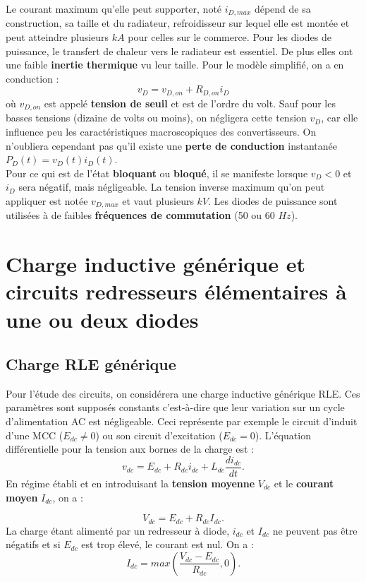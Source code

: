 		Le courant maximum qu'elle peut supporter, noté $i_{D,max}$ dépend de sa construction, sa taille et du radiateur, refroidisseur sur lequel elle est montée et peut atteindre plusieurs $kA$ pour celles sur le commerce. Pour les diodes de puissance, le transfert de chaleur vers le radiateur est essentiel. De plus elles ont une faible \textbf{inertie thermique} vu leur taille. Pour le modèle simplifié, on a en conduction :
		\begin{equation}
			v_D = v_{D,on} + R_{D,on} i_D
		\end{equation}
		où $v_{D,on}$ est appelé \textbf{tension de seuil} et est de l'ordre du volt. Sauf pour les basses tensions (dizaine de volts ou moins), on négligera cette tension $v_D$, car elle influence peu les caractéristiques macroscopiques des convertisseurs. On n'oubliera cependant pas qu'il existe une \textbf{perte de conduction} instantanée $P_D(t) = v_D(t)i_D(t)$. \\
	
		Pour ce qui est de l'état \textbf{bloquant} ou \textbf{bloqué}, il se manifeste lorsque $v_D < 0$ et $i_D$ sera négatif, mais négligeable. La tension inverse maximum qu'on peut appliquer est notée $v_{D,max}$ et vaut plusieurs $kV$. Les diodes de puissance sont utilisées à de faibles \textbf{fréquences de commutation} (50 ou 60 $Hz$).
	
	\section{Charge inductive générique et circuits redresseurs élémentaires à une ou deux diodes}
		\subsection{Charge RLE générique}
			Pour l'étude des circuits, on considérera une charge inductive générique RLE. Ces paramètres sont supposés constants c'est-à-dire que leur variation sur un cycle d'alimentation AC est négligeable. Ceci représente par exemple le circuit d'induit d'une MCC ($E_{dc}\neq 0$) ou son circuit d'excitation ($E_{dc}=0$). L'équation différentielle pour la tension aux bornes de la charge est :
			\begin{equation}
				v_{dc} = E_{dc} + R_{dc}i_{dc} + L_{dc}\frac{di_{dc}}{dt}.
			\end{equation}
			En régime établi et en introduisant la \textbf{tension moyenne} $V_{dc}$ et le \textbf{courant moyen} $I_{dc}$, on a :
			
			\begin{equation}
				V_{dc} = E_{dc} + R_{dc} I_{dc}.
			\end{equation}
			La charge étant alimenté par un redresseur à diode, $i_{dc}$ et $I_{dc}$ ne peuvent pas être négatifs et si $E_{dc}$ est trop élevé, le courant est nul. On a :
			\begin{equation}
				I_{dc} = max\left(\frac{V_{dc} - E_{dc}}{R_{dc}}, 0\right).
			\end{equation}
			
